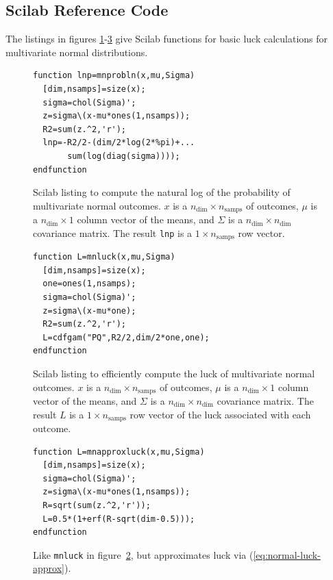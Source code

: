 \subsection{Scilab Reference Code}

The listings in figures \ref{fig:mnprobln}-\ref{fig:mnapproxluck} give Scilab functions for basic luck calculations for multivariate normal distributions.

\begin{figure}
\caption{\label{fig:mnprobln}Scilab listing to compute the natural log of the probability of multivariate normal outcomes.  $x$ is a $n_{\text{dim}} \times n_{\text{samps}}$ of outcomes, $\mu$ is a $n_{\text{dim}} \times 1$ column vector of the means, and $\Sigma$ is a $n_{\text{dim}} \times n_{\text{dim}}$ covariance matrix.  The result {\tt lnp} is a $1 \times n_{\text{samps}}$ row vector.}
\lstset{language=Scilab}
\begin{lstlisting}
function lnp=mnprobln(x,mu,Sigma)
  [dim,nsamps]=size(x);
  sigma=chol(Sigma)';
  z=sigma\(x-mu*ones(1,nsamps));
  R2=sum(z.^2,'r');
  lnp=-R2/2-(dim/2*log(2*%pi)+...
       sum(log(diag(sigma))));
endfunction
\end{lstlisting}
\end{figure}

\begin{figure}
\caption{\label{fig:mnluck}Scilab listing to efficiently compute the luck of multivariate normal outcomes.  $x$ is a $n_{\text{dim}} \times n_{\text{samps}}$ of outcomes, $\mu$ is a $n_{\text{dim}} \times 1$ column vector of the means, and $\Sigma$ is a $n_{\text{dim}} \times n_{\text{dim}}$ covariance matrix.  The result $L$ is a $1 \times n_{\text{samps}}$ row vector of the luck associated with each outcome.}
\lstset{language=Scilab}
\begin{lstlisting}
function L=mnluck(x,mu,Sigma)
  [dim,nsamps]=size(x);
  one=ones(1,nsamps);
  sigma=chol(Sigma)';
  z=sigma\(x-mu*one);
  R2=sum(z.^2,'r');
  L=cdfgam("PQ",R2/2,dim/2*one,one);
endfunction
\end{lstlisting}
\end{figure}

\begin{figure}
\caption{\label{fig:mnapproxluck}Like {\tt mnluck} in figure~\ref{fig:mnluck}, but approximates luck via (\ref{eq:normal-luck-approx}).}
\lstset{language=Scilab}
\begin{lstlisting}
function L=mnapproxluck(x,mu,Sigma)
  [dim,nsamps]=size(x);
  sigma=chol(Sigma)';
  z=sigma\(x-mu*ones(1,nsamps));
  R=sqrt(sum(z.^2,'r'));
  L=0.5*(1+erf(R-sqrt(dim-0.5)));
endfunction
\end{lstlisting}
\end{figure}

